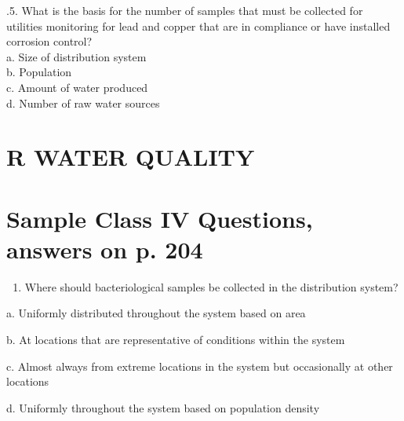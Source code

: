 \documentclass[10pt]{article}
\begin{document}
.5. What is the basis for the number of samples that must be collected for utilities monitoring for lead and copper that are in compliance or have installed corrosion control?\\
a. Size of distribution system\\
b. Population\\
c. Amount of water produced\\
d. Number of raw water sources

\section{R WATER QUALITY}
\section{Sample Class IV Questions, answers on p. 204}
\begin{enumerate}
  \item Where should bacteriological samples be collected in the distribution system?
\end{enumerate}

a. Uniformly distributed throughout the system based on area

b. At locations that are representative of conditions within the system

c. Almost always from extreme locations in the system but occasionally at other locations

d. Uniformly throughout the system based on population density
\end{document}

